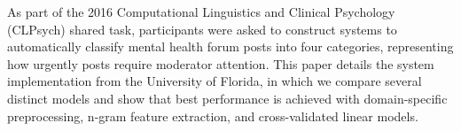 As part of the 2016 Computational Linguistics and Clinical Psychology (CLPsych) shared task, participants were asked to construct systems to automatically classify mental health forum posts into four categories, representing how urgently posts require moderator attention. This paper details the system implementation from the University of Florida, in which we compare several distinct models and show that best performance is achieved with domain-specific preprocessing, n-gram feature extraction, and cross-validated linear models.
